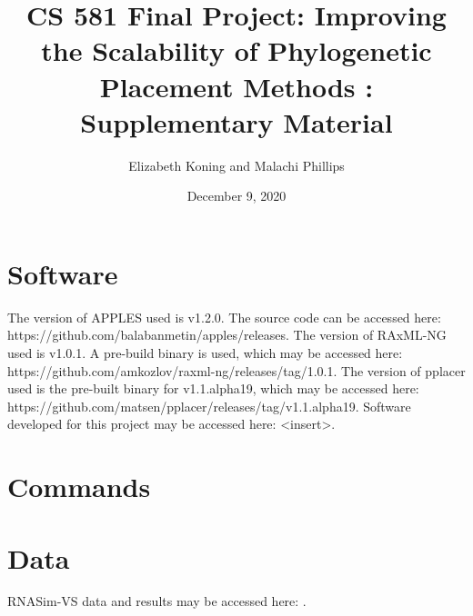 \documentclass[10pt]{article}
\title{CS 581 Final Project: Improving the Scalability of Phylogenetic Placement Methods : Supplementary Material}
\author{Elizabeth Koning and Malachi Phillips}
\date{December 9, 2020}
\begin{document}
\maketitle

\section{Software}
The version of APPLES used is v1.2.0. The source code can be accessed here: https://github.com/balabanmetin/apples/releases.
The version of RAxML-NG used is v1.0.1. A pre-build binary is used, which may be accessed here: https://github.com/amkozlov/raxml-ng/releases/tag/1.0.1.
The version of pplacer used is the pre-built binary for v1.1.alpha19, which may be accessed here: https://github.com/matsen/pplacer/releases/tag/v1.1.alpha19.
Software developed for this project may be accessed here: <insert>.

\section{Commands}
\section{Data}

RNASim-VS data and results may be accessed here: .
\end{document}
